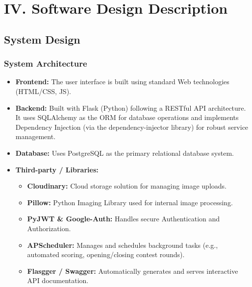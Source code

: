 \newpage

\section*{IV. Software Design Description}
\setcounter{section}{4}

\renewcommand{\thesubsection}{\arabic{subsection}}
\renewcommand{\thesubsubsection}{\thesubsection.\arabic{subsubsection}}
\setcounter{subsection}{0}

\subsection{System Design}
\label{subsec:system-design}

\subsubsection{System Architecture}
\label{subsubsec:system-architecture}

\begin{itemize}[leftmargin=1.5em, nosep]
    \item \textbf{Frontend:} The user interface is built using standard Web technologies (HTML/CSS, JS).
    \item \textbf{Backend:} Built with Flask (Python) following a RESTful API architecture. It uses SQLAlchemy as the ORM for database operations and implements Dependency Injection (via the dependency-injector library) for robust service management.
    \item \textbf{Database:} Uses PostgreSQL as the primary relational database system.
    \item \textbf{Third-party / Libraries:}
    \begin{itemize}[leftmargin=1.5em, nosep]
        \item \textbf{Cloudinary:} Cloud storage solution for managing image uploads.
        \item \textbf{Pillow:} Python Imaging Library used for internal image processing.
        \item \textbf{PyJWT \& Google-Auth:} Handles secure Authentication and Authorization.
        \item \textbf{APScheduler:} Manages and schedules background tasks (e.g., automated scoring, opening/closing contest rounds).
        \item \textbf{Flasgger / Swagger:} Automatically generates and serves interactive API documentation.
    \end{itemize}
\end{itemize}


